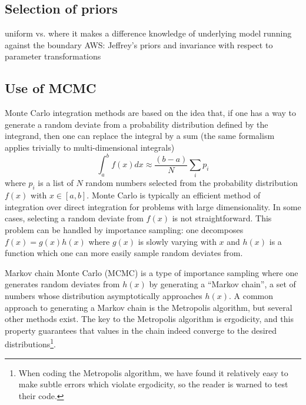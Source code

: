 \subsection{Selection of priors}  \label{subsec:selecting_priors}

  \bi
    \I uniform vs. where it makes a difference
    \I knowledge of underlying model 
    \I running against the boundary
    \I AWS: Jeffrey's priors and invariance with respect to
    parameter transformations
  \ei


\subsection{Use of MCMC}  \label{subsec:using_mcmc}

Monte Carlo integration methods are based on the idea that, if one
has a way to generate a random deviate from a probability distribution
defined by the integrand, then one can replace the integral by a sum
(the same formalism applies trivially to multi-dimensional integrals)
\begin{equation}
  \int_a^{b} f(x) dx \approx \frac{\left( b-a\right)}{N} \sum_i p_i 
\end{equation}
where $p_i$ is a list of $N$ random numbers selected from the
probability distribution $f(x)$ with $x \in [a,b]$. Monte
Carlo is typically an efficient method of integration
over direct integration for
problems with large dimensionality. In some cases,
selecting a random deviate from $f(x)$ is not straightforward.
This problem can be handled by importance sampling: one decomposes
$f(x)=g(x)h(x)$ where $g(x)$ is slowly varying with $x$ and $h(x)$
is a function which one can more easily sample random deviates from.

Markov chain Monte Carlo (MCMC) is a type of
importance sampling where one generates random deviates from $h(x)$
by generating a ``Markov chain'', a set of numbers whose distribution
asymptotically approaches $h(x)$. A common approach to generating
a Markov chain is the Metropolis algorithm, but several other methods
exist. The key to the Metropolis algorithm is ergodicity, and this
property guarantees that values in the chain indeed converge to
the desired distributions\footnote{When coding the Metropolis algorithm, we
have found it relatively easy to make subtle errors which violate
ergodicity, so the reader is warned to test their code.}.

